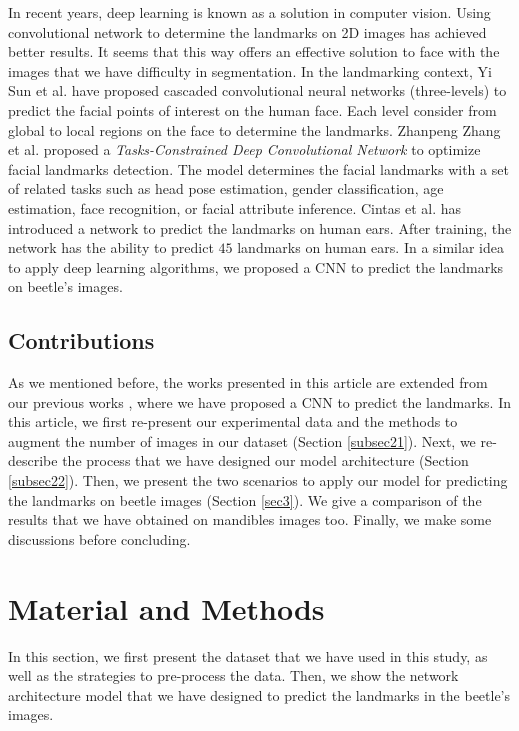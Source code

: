 \documentclass[review]{elsarticle}
\begin{document}
In recent years, deep learning is known as a solution in computer vision. Using convolutional network to determine the landmarks on 2D images has achieved better results. It seems that this way offers an effective solution to face with the images that we have difficulty in segmentation.
In the landmarking context, Yi Sun et al. \cite{sun2013deep} have proposed cascaded convolutional neural networks (three-levels) to predict the facial points of interest on the human face. Each level consider from global to local regions on the face to determine the landmarks. Zhanpeng Zhang et al. \cite{zhang2014facial} proposed a \textit{Tasks-Constrained Deep Convolutional Network} to optimize facial landmarks detection. The model determines the facial landmarks with a set of related tasks such as head pose estimation, gender classification, age estimation, face recognition, or facial attribute inference. Cintas et al. \cite{cintas2016automatic} has introduced a network to predict the landmarks on human ears. After training, the network has the ability to predict $45$ landmarks on human ears. In a similar idea to apply deep learning algorithms, we proposed a CNN to predict the landmarks on beetle's images.

\subsection{Contributions}
As we mentioned before, the works presented in this article are extended from our previous works \cite{le2018landmarks}, where we have proposed a CNN to predict the landmarks. In this article, we first re-present our experimental data and the methods to augment the number of images in our dataset (Section \ref{subsec21}). Next, we re-describe the process that we have designed our model architecture (Section \ref{subsec22}). Then, we present the two scenarios to apply our model for predicting the landmarks on beetle images (Section \ref{sec3}). We give a comparison of the results that we have obtained on mandibles images too. Finally, we make some discussions before concluding.

\section{Material and Methods}
\label{sec2}
In this section, we first present the dataset that we have used in this study, as well as the strategies to pre-process the data. Then, we show the network architecture model that we have designed to predict the landmarks in the beetle's images.
\end{document}

